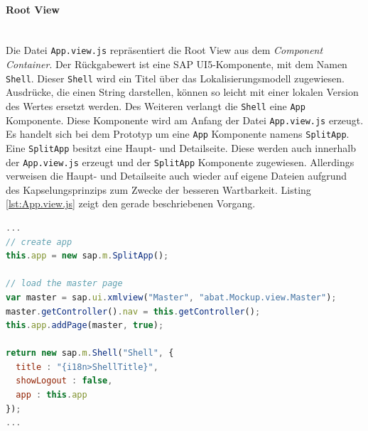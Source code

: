 \paragraph{Root View}$\;$ \\
Die Datei \texttt{App.view.js} repräsentiert die Root View aus dem \textit{Component Container}. Der Rückgabewert ist eine SAP UI5-Komponente, mit dem Namen \texttt{Shell}. Dieser \texttt{Shell} wird ein Titel über das Lokalisierungsmodell zugewiesen. Ausdrücke, die einen String darstellen, können so leicht mit einer lokalen Version des Wertes ersetzt werden. Des Weiteren verlangt die \texttt{Shell} eine \texttt{App} Komponente. Diese Komponente wird am Anfang der Datei \texttt{App.view.js} erzeugt. Es handelt sich bei dem Prototyp um eine \texttt{App} Komponente namens \texttt{SplitApp}. Eine \texttt{SplitApp} besitzt eine Haupt- und Detailseite. Diese werden auch innerhalb der \texttt{App.view.js} erzeugt und der \texttt{SplitApp} Komponente zugewiesen. Allerdings verweisen die Haupt- und Detailseite auch wieder auf eigene Dateien aufgrund des Kapselungsprinzips zum Zwecke der besseren Wartbarkeit. Listing \ref{lst:App.view.js} zeigt den gerade beschriebenen Vorgang.

\vspace{1em}
\begin{lstlisting}[language=JavaScript, caption=Root View der Applikation, label=lst:App.view.js]
...
// create app
this.app = new sap.m.SplitApp();

// load the master page
var master = sap.ui.xmlview("Master", "abat.Mockup.view.Master");
master.getController().nav = this.getController();
this.app.addPage(master, true);

return new sap.m.Shell("Shell", {
  title : "{i18n>ShellTitle}",
  showLogout : false,
  app : this.app
});
...
\end{lstlisting}
	
